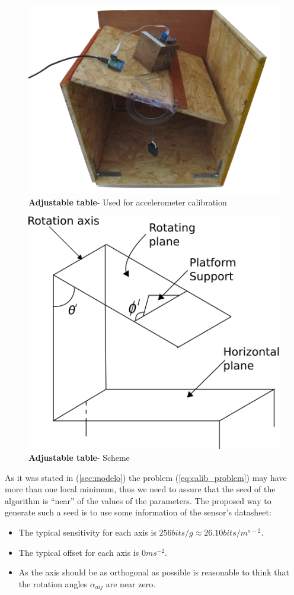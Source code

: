 \documentclass[conference]{IEEEtran}
\newcommand{\refp}[1]{(\ref{#1})}
\begin{document}
\begin{figure}
	\centering
	\includegraphics[width=.6\columnwidth]{./pics_paper/mesa.jpg}
	\caption{\textbf{Adjustable table}- Used for accelerometer calibration}
	\label{fig:mesa}
\end{figure}

\begin{figure}
	\centering
	\includegraphics[width=.6\columnwidth]{./pics_paper/mesa_esquema.png}
	\caption{\textbf{Adjustable table}- Scheme}
	\label{fig:mesa_esquema}
\end{figure}

As it was stated in \refp{sec:modelo} the problem \refp{eq:calib_problem} may have more than one local minimum, thus we need to assure that the seed of the algorithm is ``near'' of the values of the parameters. The proposed way to generate such a seed is to use some information of the sensor's datasheet\cite{bib:acc_data}: 

\begin{itemize}
\item The typical sensitivity for each axis is $256 bits/g \approx 26.10 bits / m^{s-2}$.
\item The typical offset for each axis is $0 ms^{-2}$.
\item As the axis should be as orthogonal as possible is reasonable to think that the rotation angles $\alpha_{aij}$ are near zero. 
\end{itemize}
\end{document}

